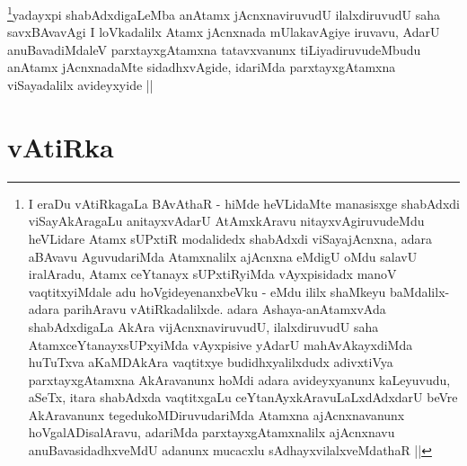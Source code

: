 \begin{artha}
\footnote{I eraDu vAtiRkagaLa BAvAthaR - hiMde heVLidaMte manasisxge
  shabAdxdi viSayAkAragaLu anitayxvAdarU AtAmxkAravu
  nitayxvAgiruvudeMdu heVLidare Atamx sUPxtiR modalidedx shabAdxdi
  viSayajAcnxna, adara aBAvavu AguvudariMda Atamxnalilx ajAcnxna
  eMdigU oMdu salavU iralAradu, Atamx ceYtanayx sUPxtiRyiMda
  vAyxpisidadx manoV vaqtitxyiMdale adu hoVgideyenanxbeVku - eMdu
  ililx  shaMkeyu baMdalilx-adara parihAravu vAtiRkadalilxde. adara
  Ashaya-anAtamxvAda shabAdxdigaLa AkAra vijAcnxnaviruvudU,
  ilalxdiruvudU saha AtamxceYtanayxsUPxyiMda vAyxpisive yAdarU
  mahAvAkayxdiMda huTuTxva aKaMDAkAra vaqtitxye budidhxyalilxdudx
  adivxtiVya parxtayxgAtamxna AkAravanunx hoMdi adara avideyxyanunx
  kaLeyuvudu, aSeTx, itara shabAdxda vaqtitxgaLu
  ceYtanAyxkAravuLaLxdAdxdarU beVre AkAravanunx tegedukoMDiruvudariMda
  Atamxna ajAcnxnavanunx hoVgalADisalAravu, adariMda
  parxtayxgAtamxnalilx ajAcnxnavu anuBavasidadhxveMdU adanunx mucacxlu
  sAdhayxvilalxveMdathaR ||}yadayxpi shabAdxdigaLeMba anAtamx jAcnxnaviruvudU
ilalxdiruvudU saha savxBAvavAgi I loVkadalilx Atamx jAcnxnada
mUlakavAgiye iruvavu, AdarU anuBavadiMdaleV parxtayxgAtamxna
tatavxvanunx tiLiyadiruvudeMbudu anAtamx jAcnxnadaMte sidadhxvAgide,
idariMda parxtayxgAtamxna viSayadalilx avideyxyide ||
\end{artha}

\section*{vAtiRka}

\stext

